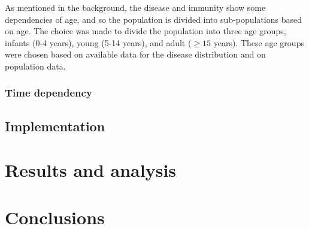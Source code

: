 \documentclass[10pt,a4paper]{article}
\begin{document}
As mentioned in the background, the disease and immunity show some dependencies of age, and so the population is divided into sub-populations based on age. The choice was made to divide the population into three age groups, infants (0-4 years), young (5-14 years), and adult ($\geq15$ years). These age groups were chosen based on available data for the disease distribution and on population data.



\subsubsection{Time dependency}

\subsection{Implementation}

\section{Results and analysis}

\section{Conclusions}




\newpage

\begin{appendices}


\end{appendices}



\end{document}
